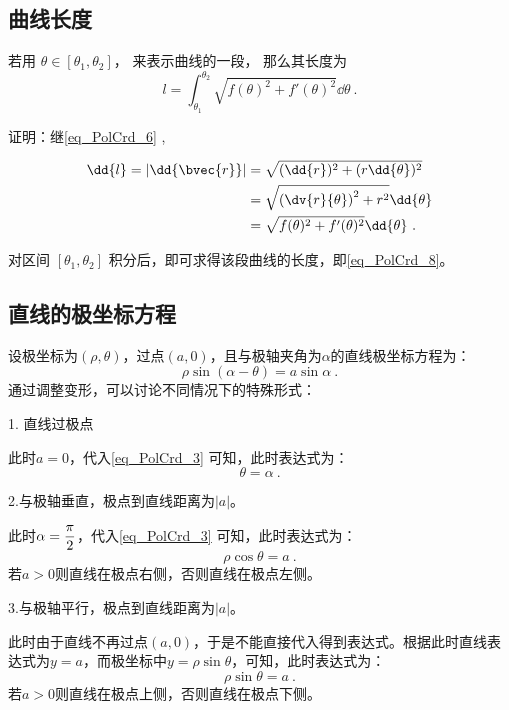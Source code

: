 \subsection{曲线长度}

若用 $\theta \in [\theta_1, \theta_2]$， 来表示曲线的一段， 那么其长度为
\begin{equation}\label{eq_PolCrd_8}
l = \int_{\theta_1}^{\theta_2} \sqrt{f(\theta)^2 + f'(\theta)^2} \dd{\theta}~.
\end{equation}

证明：继\autoref{eq_PolCrd_6} ,

\begin{equation}
\begin{split}
\dd{l} = |\dd{\bvec{r}}| &= \sqrt{(\dd{r})^2 + (r \dd{\theta})^2} \\
&= \sqrt{\left(\dv{r}{\theta}\right)^2 + r^2} \dd{\theta} \\
&= \sqrt{f(\theta)^2 + f'(\theta)^2} \dd{\theta}~.
\end{split}
\end{equation}

对区间 $[\theta_1,\theta_2]$ 积分后，即可求得该段曲线的长度，即\autoref{eq_PolCrd_8}。

\subsection{直线的极坐标方程}

设极坐标为$(\rho,\theta)$，过点$(a,0)$，且与极轴夹角为$\alpha$的直线极坐标方程为：
\begin{equation}\label{eq_PolCrd_3}
\rho\sin(\alpha-\theta)=a\sin\alpha~.
\end{equation}
通过调整变形，可以讨论不同情况下的特殊形式：

1. 直线过极点

此时$a=0$，代入\autoref{eq_PolCrd_3} 可知，此时表达式为：
\begin{equation}
\theta=\alpha~.
\end{equation}

2.与极轴垂直，极点到直线距离为$|a|$。

此时$\displaystyle\alpha={\pi\over2}$，代入\autoref{eq_PolCrd_3} 可知，此时表达式为：
\begin{equation}
\rho\cos\theta=a~.
\end{equation}
若$a>0$则直线在极点右侧，否则直线在极点左侧。

3.与极轴平行，极点到直线距离为$|a|$。

此时由于直线不再过点$(a,0)$，于是不能直接代入得到表达式。根据此时直线表达式为$y=a$，而极坐标中$y=\rho\sin\theta$，可知，此时表达式为：
\begin{equation}
\rho\sin\theta=a~.
\end{equation}
若$a>0$则直线在极点上侧，否则直线在极点下侧。




